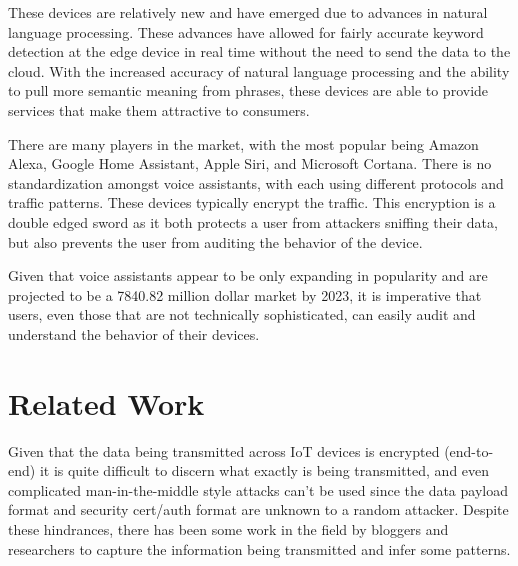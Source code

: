 \documentclass[letterpaper,twocolumn,10pt]{article}
\begin{document}
These devices are relatively new and have emerged due to advances in natural language processing. These advances have allowed for fairly accurate keyword detection at the edge device in real time without the need to send the data to the cloud. With the increased accuracy of natural language processing and the ability to pull more semantic meaning from phrases, these devices are able to provide services that make them attractive to consumers.

There are many players in the market, with the most popular being Amazon Alexa, Google Home Assistant, Apple Siri, and Microsoft Cortana. There is no standardization amongst voice assistants, with each using different protocols and traffic patterns. These devices typically encrypt the traffic. This encryption is a double edged sword as it both protects a user from attackers sniffing their data, but also prevents the user from auditing the behavior of the device. 

Given that voice assistants appear to be only expanding in popularity and are projected to be a 7840.82 million dollar market by 2023, it is imperative that users, even those that are not technically sophisticated, can easily audit and understand the behavior of their devices.

\section{Related Work}

Given that the data being transmitted across IoT devices is encrypted (end-to-end) it is quite difficult to discern what exactly is being transmitted, and even complicated man-in-the-middle style attacks can’t be used since the data payload format and security cert/auth format are unknown to a random attacker. Despite these hindrances, there has been some work in the field by bloggers and researchers to capture the information being transmitted and infer some patterns. 
\end{document}

